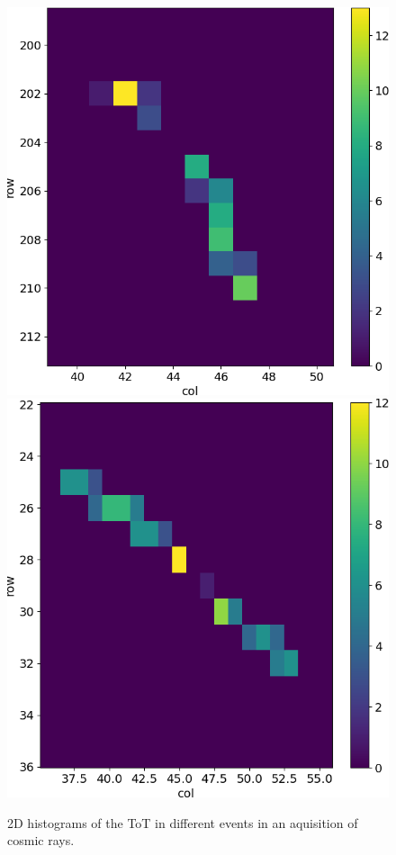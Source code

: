 \begin{figure}[h!]
            \includegraphics[width=.24\linewidth]{figures/charaterization/evts/cosmic_rays/12b.png}               
            \includegraphics[width=.24\linewidth]{figures/charaterization/evts/cosmic_rays/19a.png}
            \caption{2D histograms of the ToT in different events in an aquisition of cosmic rays.}
            \label{fig:hit_map_cosmic_rays}
        \end{figure} 

